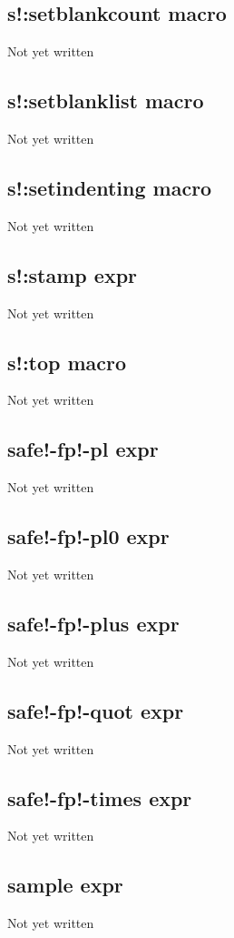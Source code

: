 \documentclass[a4paper,11pt]{article}
\begin{document}
{\subsection{\ttfamily s!:setblankcount macro}
Not yet written

\subsection{\ttfamily s!:setblanklist macro}
Not yet written

\subsection{\ttfamily s!:setindenting macro}
Not yet written

\subsection{\ttfamily s!:stamp expr}
Not yet written

\subsection{\ttfamily s!:top macro}
Not yet written

\subsection{\ttfamily safe!-fp!-pl expr}
Not yet written

\subsection{\ttfamily safe!-fp!-pl0 expr}
Not yet written

\subsection{\ttfamily safe!-fp!-plus expr}
Not yet written

\subsection{\ttfamily safe!-fp!-quot expr}
Not yet written

\subsection{\ttfamily safe!-fp!-times expr}
Not yet written

\subsection{\ttfamily sample expr}
Not yet written

}
\end{document}
